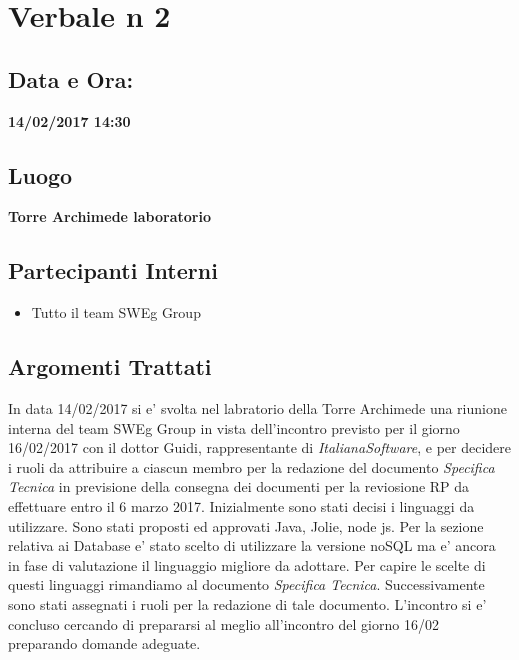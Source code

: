 \documentclass[12pt,a4paper,titlepage]{article}
\begin{document}
\section*{Verbale n 2}
\subsection*{Data e Ora:}
\begin{center}
\textbf{14/02/2017 14:30}
\subsection*{Luogo}
\textbf{Torre Archimede laboratorio}
\end{center}
\subsection*{Partecipanti Interni}
\begin{itemize}
	\item Tutto il team SWEg Group
\end{itemize}
\subsection*{Argomenti Trattati}
	In data 14/02/2017 si e' svolta nel labratorio della Torre Archimede una riunione interna del team SWEg Group in vista dell'incontro previsto per il giorno 16/02/2017 con il dottor Guidi, rappresentante di \textit{ItalianaSoftware}, e per decidere i ruoli da attribuire a ciascun membro per la redazione del documento \textit{Specifica Tecnica} in previsione della consegna dei documenti per la reviosione RP da effettuare entro il 6 marzo 2017. Inizialmente sono stati decisi i linguaggi da utilizzare. Sono stati proposti ed approvati Java, Jolie, node js. Per la sezione relativa ai Database e' stato scelto di utilizzare la versione noSQL ma e' ancora in fase di valutazione il linguaggio migliore da adottare. Per capire le scelte di questi linguaggi rimandiamo al documento \textit{Specifica Tecnica}. 
Successivamente sono stati assegnati i ruoli per la redazione di tale documento. 
L'incontro si e' concluso cercando di prepararsi al meglio all'incontro del giorno 16/02 preparando domande adeguate.
\end{document}
